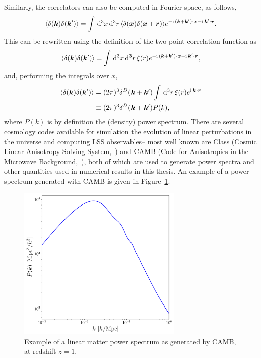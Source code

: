 Similarly, the correlators can also be computed in Fourier space, as follows, 
\begin{equation}
	\langle \delta(\bm {k}) \delta(\bm {k}') \rangle = \int \,\mathrm{d}^3 x \,\mathrm{d}^3 r \, \langle \delta(\bm {x}) \delta(\bm {x} + \bm{r})\rangle e^{-\mathrm{i\,} (\bm {k} + \bm {k}') \cdot \bm {x} - \mathrm{i\,} \bm {k}' \cdot \bm{r}}.
\end{equation}
This can be rewritten using the definition of the two-point correlation function as 
\begin{equation}
	\langle \delta(\bm {k}) \delta(\bm {k}') \rangle = \int \,\mathrm{d}^3 x \,\mathrm{d}^3 r \, \xi(r) e^{-\mathrm{i\,} (\bm {k} + \bm {k}') \cdot \bm {x} - \mathrm{i\,} \bm {k}' \cdot \bm{r}},
\end{equation}
and, performing the integrals over $x$, 
\begin{align}
	\langle \delta(\bm {k}) \delta(\bm {k}') \rangle &= (2\pi)^3 \delta^D(\bm {k} + \bm {k}') \int \,\mathrm{d}^3 r \,\xi(r) e^{\mathrm{i\,} \bm {k} \cdot \bm{r}} \\
	&\equiv (2\pi)^3 \delta^D(\bm {k} + \bm {k}') P(k),
\end{align}
where $P(k)$ is by definition the (density) power spectrum. There are several cosmology codes available for simulation the evolution of linear perturbations in the universe and computing LSS observables-- most well known are Class (Cosmic Linear Anisotropy Solving System,~\cite{Lesgourgues:2011}) and CAMB (Code for Anisotropies in the Microwave Background,~\cite{Lewis:1999bs}), both of which are used to generate power spectra and other quantities used in numerical results in this thesis. An example of a power spectrum generated with CAMB is given in Figure~\ref{fig:powerspectrum}.
\begin{figure}[!ht]
	\centering
	\includegraphics[width=0.7\textwidth]{fig/matterpower_z1.pdf}
	\caption{Example of a linear matter power spectrum as generated by CAMB, at redshift $z=1$.}
	\label{fig:powerspectrum}
\end{figure}


